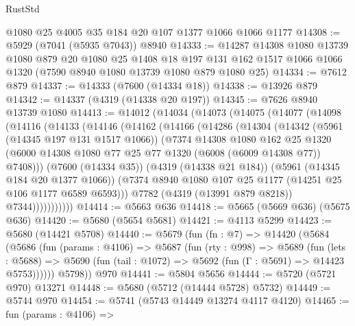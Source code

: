 \begin{lexlean}{RustStd}
\begin{coremodule}
    @1080
    @25
    @4005
    @35
    @184
    @20
    @107
    @1377
    @1066
    @1066
    @1177
@14308 := @5929 (@7041 (@5935 @7043)) @8940
@14333 := @14287
    @14308
    @1080
    @13739
    @1080
    @879
    @20
    @1080
    @25
    @1408
    @18
    @197
    @131
    @162
    @1517
    @1066
    @1066
    @1320
    (@7590 @8940 @1080 @13739 @1080 @879 @1080 @25)
@14334 := @7612 @879
@14337 := @14333 (@7600 (@14334 @18))
@14338 := @13926 @879
@14342 := @14337 (@4319 (@14338 @20 @197))
@14345 := @7626 @8940 @13739 @1080
@14413 := @14012
    (@14034
      (@14073
        (@14075
          (@14077
            (@14098
              (@14116
                (@14133
                  (@14146
                    (@14162
                      (@14166
                        (@14286
                          (@14304
                            (@14342
                              (@5961 (@14345 @197 @131 @1517 @1066))
                              (@7374
                                @14308
                                @1080
                                @162
                                @25
                                @1320
                                (@6000
                                  @14308
                                  @1080
                                  @77
                                  @25
                                  @77
                                  @1320
                                  (@6008 (@6009 @14308 @77))
                                  @7408)))
                            (@7600 (@14334 @35))
                            (@4319 (@14338 @21 @184))
                            (@5961 (@14345 @184 @20 @1377 @1066))
                            (@7374 @8940 @1080 @107 @25 @1177 (@14251 @25 @106 @1177 @6589 @6593)))
                          @7782
                          (@4319 (@13991 @879 @8218))
                          @7344)))))))))))
@14414 := @5663 @636
@14418 := @5665 (@5669 @636) (@5675 @636)
@14420 := @5680 (@5654 @5681)
@14421 := @4113 @5299
@14423 := @5680 (@14421 @5708)
@14440 := @5679
    (fun (fn : @7) =>
    @14420
      (@5684
        (@5686
          (fun (params : @4106) =>
          @5687
            (fun (rty : @998) =>
            @5689
              (fun (lets : @5688) =>
              @5690 (fun (tail : @1072) => @5692 (fun (Γ : @5691) => @14423 @5753))))))
        @5798))
    @970
@14441 := @5804 @5656
@14444 := @5720 (@5721 @970) @13271
@14448 := @5680 (@5712 (@14444 @5728) @5732)
@14449 := @5744 @970
@14454 := @5741 (@5743 @14449 @13274 @4117 @4120)
@14465 := fun (params : @4106) =>

\end{coremodule}
\end{lexlean}
